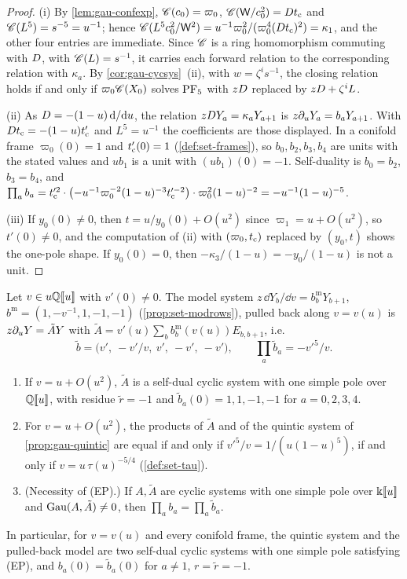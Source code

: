 \begin{proof}
(i) By \cref{lem:gau-confexp}, $\mathscr{C}(c_0)=\varpi_0$, $\mathscr{C}(\mathsf W/c_0^2)=Dt_{\mathrm{c}}$ and $\mathscr{C}(L^5)=s^{-5}=u^{-1}$; hence $\mathscr{C}(L^5c_0^2/\mathsf W^2)=u^{-1}\varpi_0^2/(\varpi_0^4(Dt_{\mathrm{c}})^2)=\kappa_1$, and the other four entries are immediate. Since $\mathscr{C}$ is a ring homomorphism commuting with $D$, with $\mathscr{C}(L)=s^{-1}$, it carries each forward relation to the corresponding relation with $\kappa_a$. By \cref{cor:gau-cycsys}~(ii), with $w=\zeta^is^{-1}$, the closing relation holds if and only if $\varpi_0\mathscr{C}(X_0)$ solves $\mathrm{PF}_{5}$ with $zD$ replaced by $zD+\zeta^iL$.

(ii) As $D=-(1-u)\,\mathrm{d}/\mathrm{d} u$, the relation $zD Y_a=\kappa_aY_{a+1}$ is $z\partial_uY_a=b_aY_{a+1}$. With $Dt_{\mathrm{c}}=-(1-u)t_{\mathrm{c}}'$ and $L^5=u^{-1}$ the coefficients are those displayed. In a conifold frame $\varpi_0(0)=1$ and $t_{\mathrm{c}}'(0)=1$ (\cref{def:set-frames}), so $b_0,b_2,b_3,b_4$ are units with the stated values and $ub_1$ is a unit with $(ub_1)(0)=-1$. Self-duality is $b_0=b_2$, $b_3=b_4$, and $\prod_ab_a=t_{\mathrm{c}}'^2\cdot\bigl(-u^{-1}\varpi_0^{-2}(1-u)^{-3}t_{\mathrm{c}}'^{-2}\bigr)\cdot\varpi_0^2(1-u)^{-2}=-u^{-1}(1-u)^{-5}$.

(iii) If $y_0(0)\neq0$, then $t=u/y_0(0)+O(u^2)$ since $\varpi_1=u+O(u^2)$, so $t'(0)\neq0$, and the computation of (ii) with $(\varpi_0,t_{\mathrm{c}})$ replaced by $(y_0,t)$ shows the one-pole shape. If $y_0(0)=0$, then $-\kappa_3/(1-u)=-y_0/(1-u)$ is not a unit.
\end{proof}

\begin{prop}
\label{prop:gau-equalprod}
Let $v\in u\mathbb{Q}[\![ u ]\!]$ with $v'(0)\neq0$. The model system $z\,\dd Y_b/\dd v=b^{\mathrm m}_bY_{b+1}$, $b^{\mathrm m}=(1,-v^{-1},1,-1,-1)$ (\cref{prop:set-modrows}), pulled back along $v=v(u)$ is $z\partial_uY=\tilde AY$ with $\tilde A=v'(u)\sum_bb^{\mathrm m}_b(v(u))E_{b,b+1}$, i.e.
\[
\tilde b=\bigl(v',\ -v'/v,\ v',\ -v',\ -v'\bigr),\qquad \prod_a\tilde b_a=-v'^5/v .
\]
\begin{enumerate}
\item If $v=u+O(u^2)$, $\tilde A$ is a self-dual cyclic system with one simple pole over $\mathbb{Q}[\![ u ]\!]$, with residue $\tilde r=-1$ and $\tilde b_a(0)=1,1,-1,-1$ for $a=0,2,3,4$.
\item For $v=u+O(u^2)$, the products of $\tilde A$ and of the quintic system of \cref{prop:gau-quintic} are equal if and only if $v'^5/v=1/(u(1-u)^5)$, if and only if $v=u\,\tau(u)^{-5/4}$ (\cref{def:set-tau}).
\item (Necessity of (EP).) If $A,\tilde A$ are cyclic systems with one simple pole over $\Bbbk[\![ u ]\!]$ and $\operatorname{Gau}(A,\tilde A)\neq0$, then $\prod_ab_a=\prod_a\tilde b_a$.
\end{enumerate}
In particular, for $v=v(u)$ and every conifold frame, the quintic system and the pulled-back model are two self-dual cyclic systems with one simple pole satisfying (EP), and $b_a(0)=\tilde b_a(0)$ for $a\neq1$, $r=\tilde r=-1$.
\end{prop}

